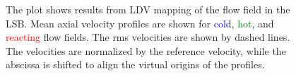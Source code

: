 \begin{figure}

\centering



\caption[Effect of preheat temperature on the LSB flow field - I]{The plot shows results from LDV mapping of the flow field in the LSB. Mean axial velocity profiles are shown for \textcolor{blue}{cold}, \textcolor{green}{hot}, and \textcolor{red}{reacting} flow fields. The rms velocities are shown by dashed lines. The velocities are normalized by the reference velocity, while the abscissa is shifted to align the virtual origins of the profiles.}

\label{fig:temperatureLDVResults}

\end{figure}

